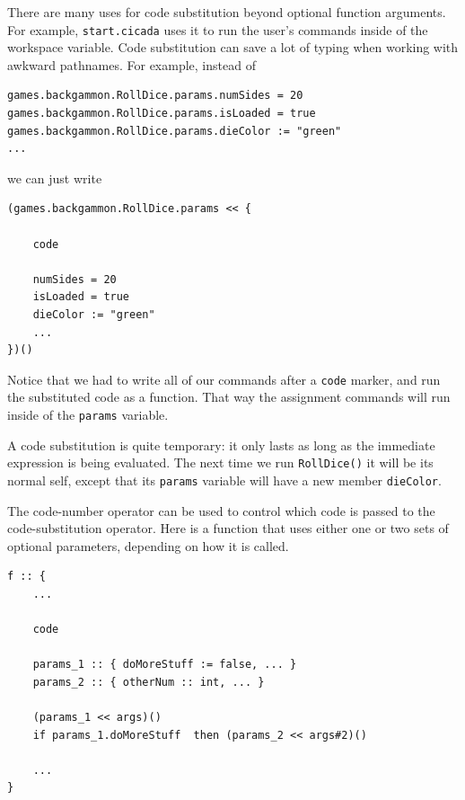 \documentclass{article}
\newenvironment{code}{
       \begin{list}{}{
               \setlength{\leftmargin}{.4in}
               \setlength{\rightmargin}{0in}
               \setlength{\topsep}{.2in}
       }
       \small
       \item[] }
       { \end{list}   }
\begin{document}
There are many uses for code substitution beyond optional function arguments.  For example, \verb#start.cicada# uses it to run the user's commands inside of the workspace variable.  Code substitution can save a lot of typing when working with awkward pathnames.  For example, instead of

\begin{code} \begin{verbatim}
games.backgammon.RollDice.params.numSides = 20
games.backgammon.RollDice.params.isLoaded = true
games.backgammon.RollDice.params.dieColor := "green"
...
\end{verbatim} \end{code}

\noindent we can just write

\begin{code} \begin{verbatim}
(games.backgammon.RollDice.params << {
    
    code
    
    numSides = 20
    isLoaded = true
    dieColor := "green"
    ...
})()
\end{verbatim} \end{code}

\noindent Notice that we had to write all of our commands after a \texttt{code} marker, and run the substituted code as a function.  That way the assignment commands will run inside of the \verb#params# variable.

A code substitution is quite temporary:  it only lasts as long as the immediate expression is being evaluated.  The next time we run \verb#RollDice()# it will be its normal self, except that its \verb#params# variable will have a new member \verb#dieColor#.

The code-number operator can be used to control which code is passed to the code-substitution operator.  Here is a function that uses either one or two sets of optional parameters, depending on how it is called.

\begin{code} \begin{verbatim}
f :: {
    ...
    
    code
    
    params_1 :: { doMoreStuff := false, ... }
    params_2 :: { otherNum :: int, ... }
    
    (params_1 << args)()
    if params_1.doMoreStuff  then (params_2 << args#2)()
    
    ...
}
\end{verbatim} \end{code}
\end{document}
